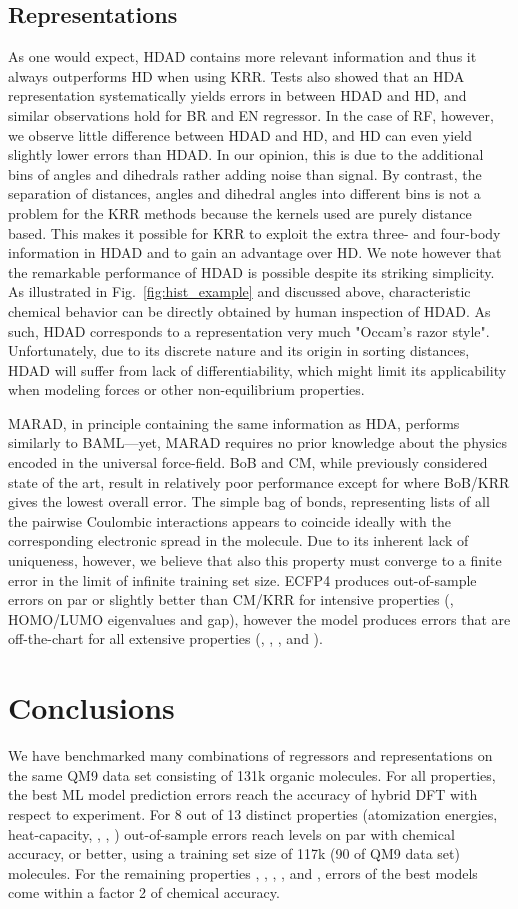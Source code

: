\documentclass[reprint, superscriptaddress,
amsmath,amssymb, aps, prb,
]{revtex4-1}
\begin{document}
{\subsection{Representations}
As one would expect, HDAD contains more relevant information and thus it always outperforms HD when using KRR. 
Tests also showed that an HDA representation systematically yields errors in between HDAD and HD, and similar observations hold for BR and EN regressor. 
In the case of RF, however, we observe little difference between HDAD and HD, and HD can even yield slightly lower errors than HDAD. 
In our opinion, this is due to the additional bins of angles and dihedrals rather adding noise than signal. 
By contrast, the separation of distances, angles and dihedral angles into different bins is not a problem for the KRR methods because the kernels used are purely  distance based. This makes it possible for KRR to exploit the extra three- and four-body information in HDAD and to gain an advantage over HD. 
We note however that the remarkable performance of HDAD is possible despite its striking simplicity. 
As illustrated in Fig.~\ref{fig:hist_example} and discussed above, characteristic chemical behavior
can be directly obtained by human inspection of HDAD. As such, HDAD corresponds to a representation very much "Occam's razor style". Unfortunately, due to its discrete nature and its origin in sorting distances, HDAD will suffer from lack of differentiability, which might limit its applicability when modeling forces or other non-equilibrium properties.


MARAD, in principle containing the same information as HDA, performs similarly to BAML---yet, MARAD requires no prior
knowledge about the physics encoded in the universal force-field. 
BoB and CM, while previously considered state of the art, result in relatively poor performance except for  where
BoB/KRR gives the lowest overall error. The simple bag of bonds, representing lists of all the pairwise Coulombic interactions
appears to coincide ideally with the corresponding electronic spread in the molecule. Due to its inherent lack of uniqueness, however, 
we believe that also this property must converge to a finite error in the limit of infinite training set size. 
ECFP4 produces out-of-sample errors on par or slightly better than CM/KRR for intensive properties (, HOMO/LUMO eigenvalues and gap), 
however the model produces errors that are off-the-chart for all extensive properties (, , ,  and ).

\section{Conclusions}
We have benchmarked many combinations of regressors and representations on the same QM9 data set consisting of 131k organic molecules. 
For all properties, the best ML model prediction errors reach the accuracy of hybrid DFT with respect to experiment.
For 8 out of 13 distinct properties (atomization energies, heat-capacity, , , ) 
out-of-sample errors reach levels on par with chemical accuracy, or better, using a training set size of 117k (90 of QM9 data set) molecules.
For the remaining properties , , , , and ,
errors of the best models come within a factor 2 of chemical accuracy.

}
\end{document}
